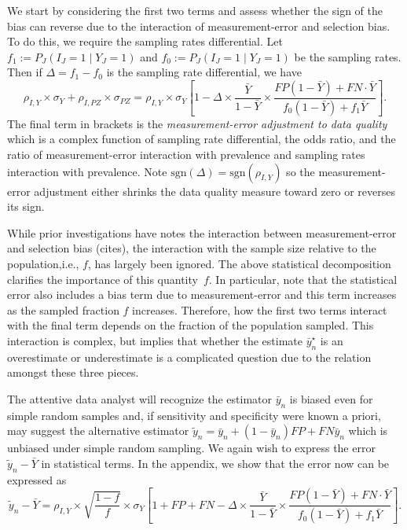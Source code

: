 \documentclass[12pt]{article}
\numberwithin{equation}{section}
\theoremstyle{plain}
\def\sgn{\text{sgn}}
\begin{document}
We start by considering the first two terms and assess whether the sign of the bias can reverse due to the interaction of measurement-error and selection bias.  To do this, we require the sampling rates differential.  Let $f_1 := P_J(I_J = 1 \mid Y_J = 1)$ and $f_0 := P_J(I_J = 1 \mid Y_J = 1)$ be the sampling rates.  Then if $\Delta = f_1 - f_0$ is the sampling rate differential, we have
$$
\rho_{I,Y} \times \sigma_Y + \rho_{I,PZ} \times \sigma_{PZ} =
\rho_{I,Y} \times \sigma_Y \left[ 1 - \Delta \times \frac{\bar Y}{1-\bar Y} \times \frac{FP(1-\bar Y) + FN \cdot \bar Y}{f_0 (1-\bar Y) + f_1 \bar Y} \right].
$$
The final term in brackets is the \emph{measurement-error adjustment to data quality} which is a complex function of sampling rate differential, the odds ratio, and the ratio of measurement-error interaction with prevalence and sampling rates interaction with prevalence. Note $\sgn(\Delta) = \sgn(\rho_{I,Y})$ so the measurement-error adjustment either shrinks the data quality measure toward zero or reverses its sign.

While prior investigations have notes the interaction between measurement-error and selection bias (cites), the interaction with the sample size relative to the population,i.e., $f$, has largely been ignored.  The above statistical decomposition clarifies the importance of this quantity~$f$.  In particular, note that the statistical error also includes a bias term due to measurement-error and this term increases as the sampled fraction $f$ increases. Therefore, how the first two terms interact with the final term depends on the fraction of the population sampled.  This interaction is complex, but implies that whether the estimate $\bar y^\star_n$ is an overestimate or underestimate is a complicated question due to the relation amongst these three pieces.

The attentive data analyst will recognize the estimator $\bar y_n$ is biased even for simple random samples and, if sensitivity and specificity were known a priori, may suggest the alternative estimator $\tilde y_n = \bar y_n + (1-\bar y_n) FP + FN \bar y_n$ which is unbiased under simple random sampling. We again wish to express the error $\tilde  y_n - \bar Y$ in statistical terms. In the appendix, we show that the error now can be expressed as
$$
\tilde y_n - \bar Y = \rho_{I,Y} \times \sqrt{\frac{1-f}{f}} \times \sigma_{Y}
\left[ 1 + FP + FN - \Delta \times \frac{\bar Y}{1-\bar Y} \times \frac{FP(1-\bar Y) + FN \cdot \bar Y}{f_0 (1-\bar Y) + f_1 \bar Y} \right].
$$
\end{document}
